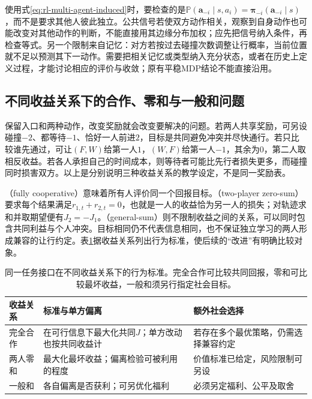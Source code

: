 使用式\eqref{eq:rl-multi-agent-induced}时，要检查的是$\mathbb P(\bm a_{-i}\mid s,a_i)=\bm\pi_{-i}(\bm a_{-i}\mid s)$，而不是要求其他人彼此独立。公共信号若使双方动作相关，观察到自身动作也可能改变对其他动作的判断，不能直接用其边缘分布加权；应先把信号纳入条件，再检查等式。另一个限制来自记忆：对方若按过去碰撞次数调整让行概率，当前位置就不足以预测其下一动作。需要把相关记忆或类型纳入充分状态，或者在历史上定义过程，才能讨论相应的评价与收敛；原有平稳MDP结论不能直接沿用。

\subsection{不同收益关系下的合作、零和与一般和问题}
\label{sec:rl-multi-agent-payoffs}

保留入口和两种动作，改变奖励就会改变要解决的问题。若两人共享奖励，可另设碰撞$-2$、都等待$-1$、恰好一人前进$2$，目标是共同避免冲突并尽快通行。若只比较谁先通过，可让$(F,W)$给第一人$1$，$(W,F)$给第一人$-1$，其余为$0$，第二人取相反收益。若各人承担自己的时间成本，则等待者可能比先行者损失更多，而碰撞同时损害双方。以上是分别说明三种收益关系的教学设定，不是同一奖励表。

（fully cooperative）意味着所有人评价同一个回报目标。（two-player zero-sum）要求每个结果满足$r_{1,t}+r_{2,t}=0$，也就是一人的收益恰为另一人的损失；对轨迹求和并取期望便有$J_2=-J_1$。（general-sum）则不限制收益之间的关系，可以同时包含共同利益与个人冲突。目标相同仍不代表信息相同，也不保证独立学习的两人形成兼容的让行约定。表\ref{tab:rl-multi-agent-payoffs}据收益关系列出行为标准，使后续的“改进”有明确比较对象。

\begin{table}[htbp]
 \centering
 \begin{tabularx}{\linewidth}{@{}l >{\raggedright\arraybackslash}X >{\raggedright\arraybackslash}X@{}}
 \toprule
 收益关系 & 标准与单方偏离 & 额外社会选择\\
 \midrule
 完全合作 & 在可行信息下最大化共同$J$；单方改动也按共同收益计 & 若存在多个最优策略，仍需选择兼容约定\\
 两人零和 & 最大化最坏收益；偏离检验可被利用的程度 & 价值标准已给定，风险限制可另设\\
 一般和 & 各自偏离是否获利；可另优化福利 & 必须另定福利、公平及取舍\\
 \bottomrule
 \end{tabularx}
 \caption{同一任务接口在不同收益关系下的行为标准。完全合作可比较共同回报，零和可比较最坏收益，一般和须另行指定社会目标。}
 \label{tab:rl-multi-agent-payoffs}
\end{table}

